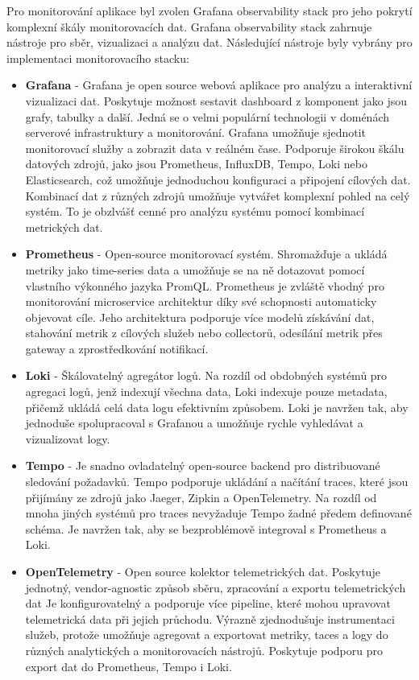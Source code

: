 
Pro monitorování aplikace byl zvolen Grafana observability stack pro jeho pokrytí komplexní škály monitorovacích dat. Grafana observability stack zahrnuje nástroje pro sběr, vizualizaci a analýzu dat. Následující nástroje byly vybrány pro implementaci monitorovacího stacku:

\begin{itemize}
  \item \textbf{Grafana} - Grafana je open source webová aplikace pro analýzu a interaktivní vizualizaci dat. Poskytuje možnost sestavit dashboard z komponent jako jsou grafy, tabulky a další. Jedná se o velmi populární technologii v doménách serverové infrastruktury a monitorování. Grafana umožňuje sjednotit monitorovací služby a zobrazit data v reálném čase. Podporuje širokou škálu datových zdrojů, jako jsou Prometheus, InfluxDB, Tempo, Loki nebo Elasticsearch, což umožňuje jednoduchou konfiguraci a připojení cílových dat. Kombinací dat z různých zdrojů umožňuje vytvářet komplexní pohled na celý systém. To je obzlvášť cenné pro analýzu systému pomocí kombinací metrických dat.
  \item \textbf{Prometheus} - Open-source monitorovací systém. Shromažďuje a ukládá metriky jako time-series data a umožňuje se na ně dotazovat pomocí vlastního výkonného jazyka PromQL. Prometheus je zvláště vhodný pro monitorování microservice architektur díky své schopnosti automaticky objevovat cíle. Jeho architektura podporuje více modelů získávání dat, stahování metrik z cílových služeb nebo collectorů, odesílání metrik přes gateway a zprostředkování notifikací.
  \item \textbf{Loki} - Škálovatelný agregátor logů. Na rozdíl od obdobných systémů pro agregaci logů, jenž indexují všechna data, Loki indexuje pouze metadata, přičemž ukládá celá data logu efektivním způsobem. Loki je navržen tak, aby jednoduše spolupracoval s Grafanou a umožňuje rychle vyhledávat a vizualizovat logy.
  \item \textbf{Tempo} - Je snadno ovladatelný open-source backend pro distribuované sledování požadavků. Tempo podporuje ukládání a načítání traces, které jsou přijímány ze zdrojů jako Jaeger, Zipkin a OpenTelemetry. Na rozdíl od mnoha jiných systémů pro traces nevyžaduje Tempo žadné předem definované schéma. Je navržen tak, aby se bezproblémově integroval s Prometheus a Loki.
  \item \textbf{OpenTelemetry} - Open source kolektor telemetrických dat. Poskytuje jednotný, vendor-agnostic způsob sběru, zpracování a exportu telemetrických dat  Je konfigurovatelný a podporuje více pipeline, které mohou upravovat telemetrická data při jejich průchodu. Výrazně zjednodušuje instrumentaci služeb, protože umožňuje agregovat a exportovat metriky, taces a logy do různých analytických a monitorovacích nástrojů. Poskytuje podporu pro export dat do Prometheus, Tempo i Loki.

\end{itemize}
